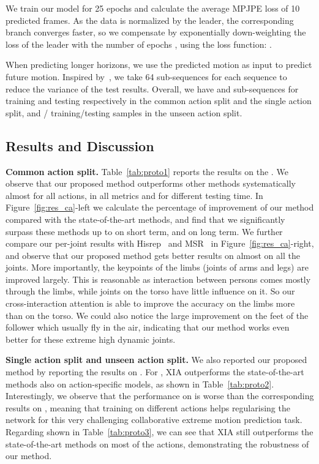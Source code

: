 We train our model for 25 epochs and calculate the average MPJPE loss of 10 predicted frames. As the data is normalized by the leader, the corresponding branch converges faster, so we compensate by exponentially down-weighting the loss of the leader with the number of epochs , using the loss function: .

When predicting longer horizons, we use the predicted motion as input to predict future motion. {Inspired by~\cite{mao2020history}, we take 64 sub-sequences for each sequence to reduce the variance of the test results.} Overall, we have  and  sub-sequences for training and testing respectively in the {common action split} and {the single action split}, and  /   training/testing samples in the {unseen action split}.



\vspace{-2mm}
\subsection{Results and Discussion}
\label{sec:res_proto1}

\vspace{-1mm}
\noindent\textbf{Common action split.} 
Table~\ref{tab:proto1} reports the results  on the . We observe that our proposed method outperforms other methods systematically almost for all actions, in all metrics and for different testing time. 
In Figure~\ref{fig:res_ca}-left we calculate the percentage of improvement of our method compared with the state-of-the-art methods, and find that we significantly surpass these methods up to  on short term,  and  on long term. 
We further compare our per-joint results with Hisrep~\cite{mao2020history} and MSR~\cite{Dang_2021_ICCV} in Figure~\ref{fig:res_ca}-right, and observe that our proposed method gets better results on almost on all the joints. More importantly, the keypoints of the limbs (joints of arms and legs) are improved largely. This is reasonable as interaction between persons comes mostly through the limbs, while joints on the torso have little influence on it. So our cross-interaction attention is able to improve the accuracy on the limbs more than on the torso. We could also notice the large improvement on the feet of the follower which usually fly in the air, indicating that our method works even better for these extreme high dynamic joints.  

\noindent\textbf{Single action split and unseen action split.} 
We also reported our proposed method by reporting the results on . For ,  XIA outperforms the state-of-the-art methods also on action-specific models, as shown in Table~\ref{tab:proto2}. Interestingly, we observe that the performance on  is worse than the corresponding results on , meaning that training on different actions helps regularising the network for this very challenging collaborative extreme motion prediction task.
Regarding  shown in Table~\ref{tab:proto3}, we can see that XIA still outperforms the state-of-the-art methods on most of the actions, demonstrating the robustness of our method.



